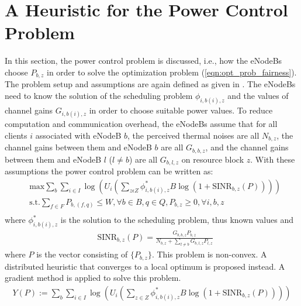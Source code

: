 \documentclass[journal]{IEEEtran} 				\IEEEoverridecommandlockouts 	\usepackage{amsmath,amssymb}
\begin{document}
\section{A Heuristic for the Power Control Problem}\label{sec:power_control}
In this section, the power control problem is discussed, i.e., how the eNodeBs choose $P_{b,z}$ in order to solve the optimization problem (\ref{eqn:opt_prob_fairness}). The problem setup and assumptions are again defined as given in \cite{SelfOrganizedLTE}. The eNodeBs need to know the solution of the scheduling problem $\phi_{i,b(i),z}$ and the values of channel gains $G_{i,b(i),z}$ in order to choose suitable power values. To reduce computation and communication overhead, the eNodeBs assume that for all clients $i$ associated with eNodeB $b$, the perceived thermal noises are all $N_{b,z}$, the channel gains between them and eNodeB $b$ are all $G_{b,b,z}$, and the channel gains between them and eNodeB $l$ ($l\neq b$) are all $G_{b,l,z}$  on resource block $z$. With these assumptions the power control problem can be written as:
\begin{equation}\label{eqn:PowerControl}
\begin{aligned}
& {\text{max}}\sum_{b}\sum_{i \in I}\log(U_i(\sum_{z\epsilon Z}\phi_{i,b(i),z}^* B \log(1+\text{SINR}_{b,z}(P)))) \\
& \text{s.t.}\sum_{f \in F}{P_{b,(f,q)} \leq W}, \forall b \in B, q \in Q, P_{b,z} \geq 0, \forall i,b,z \\
\end{aligned}
\end{equation}
where $\phi_{i,b(i),z}^*$ is the solution to the scheduling problem, thus known values and 
\begin{equation*}\label{eqn:SINRbz}
\begin{aligned}
& {\text{SINR}}_{b,z}(P)=\frac{G_{b,b,z}P_{b,z}}{N_{b,z}+\sum_{l \neq b} G_{b,l,z}P_{l,z}}
\end{aligned}
\end{equation*}
where $P$ is the vector consisting of $\{P_{b,z}\}$.
This problem is non-convex. A distributed heuristic that converges to a local optimum is proposed instead. A gradient method is applied to solve this problem. 
\begin{equation}\label{eqn:Y_P1}
\begin{aligned}
Y(P) := \sum_b \sum_{i \in I} \log(U_i(\sum_{z \in Z}\phi_{i,b(i),z}^*B\log(1+\text{SINR}_{b,z}(P))))
\end{aligned}
\end{equation}
\end{document}
